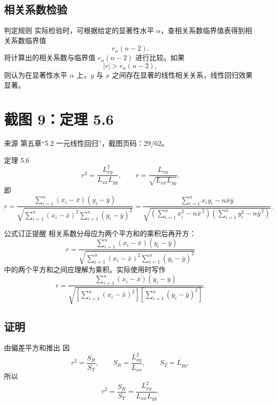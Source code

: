 \documentclass[UTF8,zihao=-4,fontset=fandol]{ctexart}
\begin{document}
\subsection{相关系数检验}

\begin{methodbox}{判定规则}
实际检验时，可根据给定的显著性水平 $\alpha$，查相关系数临界值表得到相关系数临界值
\[
r_{\alpha}(n-2).
\]
将计算出的相关系数与临界值 $r_{\alpha}(n-2)$ 进行比较。如果
\[
|r|>r_{\alpha}(n-2),
\]
则认为在显著性水平 $\alpha$ 上，$y$ 与 $x$ 之间存在显著的线性相关关系，线性回归效果显著。
\end{methodbox}

\section{截图 9：定理 5.6}

\begin{sourcebox}{来源}
第五章“5.2 一元线性回归”，截图页码：29/62。
\end{sourcebox}

\begin{keybox}{定理 5.6}
\[
r^2=\frac{L_{xy}^{2}}{L_{xx}L_{yy}},
\qquad
r=\frac{L_{xy}}{\sqrt{L_{xx}L_{yy}}}.
\]
即
\[
r=
\frac{\sum_{i=1}^{n}(x_i-\bar{x})(y_i-\bar{y})}
{\sqrt{\sum_{i=1}^{n}(x_i-\bar{x})^2
\sum_{i=1}^{n}(y_i-\bar{y})^2}}
=
\frac{\sum_{i=1}^{n}x_iy_i-n\bar{x}\bar{y}}
{\sqrt{
\left(\sum_{i=1}^{n}x_i^2-n\bar{x}^{\,2}\right)
\left(\sum_{i=1}^{n}y_i^2-n\bar{y}^{\,2}\right)
}}.
\]
\end{keybox}

\begin{warnbox}{公式订正提醒}
相关系数分母应为两个平方和的乘积后再开方：
\[
r=
\frac{\sum_{i=1}^{n}(x_i-\bar{x})(y_i-\bar{y})}
{\sqrt{\sum_{i=1}^{n}(x_i-\bar{x})^2
\sum_{i=1}^{n}(y_i-\bar{y})^2}}
\]
中的两个平方和之间应理解为乘积。实际使用时写作
\[
r=
\frac{\sum_{i=1}^{n}(x_i-\bar{x})(y_i-\bar{y})}
{\sqrt{
\left[\sum_{i=1}^{n}(x_i-\bar{x})^2\right]
\left[\sum_{i=1}^{n}(y_i-\bar{y})^2\right]
}}.
\]
\end{warnbox}

\subsection{证明}

\begin{keybox}{由偏差平方和推出}
因
\[
r^2=\frac{S_R}{S_T},
\qquad
S_R=\frac{L_{xy}^{2}}{L_{xx}},
\qquad
S_T=L_{yy},
\]
所以
\[
r^2=\frac{S_R}{S_T}
=
\frac{L_{xy}^{2}}{L_{xx}L_{yy}}.
\]
\end{keybox}
\end{document}
